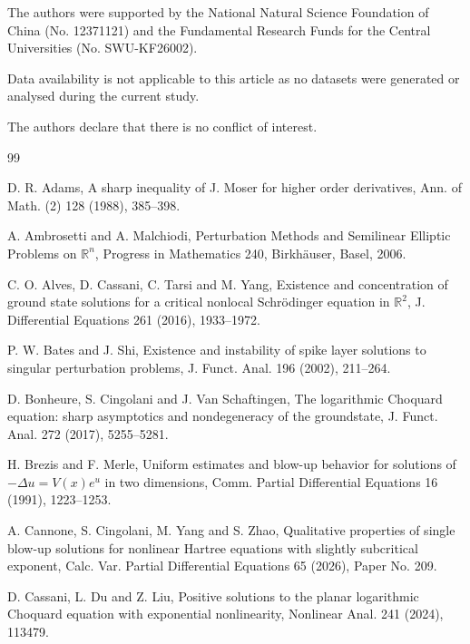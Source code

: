 \documentclass[11pt]{article}
\numberwithin{equation}{section}
\begin{document}

The authors were supported by the National Natural Science Foundation of China (No. 12371121) and the Fundamental Research Funds for the Central Universities (No. SWU-KF26002).


Data availability is not applicable to this article as no datasets were generated or analysed during the current study.


The authors declare that there is no conflict of interest.

\begin{thebibliography}{99}

D. R. Adams,
A sharp inequality of J. Moser for higher order derivatives,
Ann. of Math. (2) 128 (1988), 385--398.

A. Ambrosetti and A. Malchiodi,
Perturbation Methods and Semilinear Elliptic Problems on $\mathbb R^{n}$,
Progress in Mathematics 240, Birkh\"auser, Basel, 2006.

C. O. Alves, D. Cassani, C. Tarsi and M. Yang,
Existence and concentration of ground state solutions for a critical
nonlocal Schr\"odinger equation in $\mathbb R^2$,
J. Differential Equations 261 (2016), 1933--1972.

P. W. Bates and J. Shi,
Existence and instability of spike layer solutions to singular perturbation problems,
J. Funct. Anal. 196 (2002), 211--264.

D. Bonheure, S. Cingolani and J. Van Schaftingen,
The logarithmic Choquard equation: sharp asymptotics and
nondegeneracy of the groundstate,
J. Funct. Anal. 272 (2017), 5255--5281.

H. Brezis and F. Merle,
Uniform estimates and blow-up behavior for solutions of $-\Delta u=V(x)e^{u}$ in two dimensions,
Comm. Partial Differential Equations 16 (1991), 1223--1253.

A. Cannone, S. Cingolani, M. Yang and S. Zhao,
Qualitative properties of single blow-up solutions for nonlinear
Hartree equations with slightly subcritical exponent,
Calc. Var. Partial Differential Equations 65 (2026), Paper No. 209.

D. Cassani, L. Du and Z. Liu,
Positive solutions to the planar logarithmic Choquard equation with
exponential nonlinearity,
Nonlinear Anal. 241 (2024), 113479.


\end{thebibliography}
\end{document}
